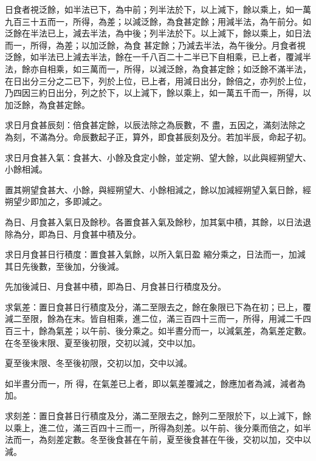 \begin{pinyinscope}
 日食者視泛餘，如半法已下，為中前；列半法於下，以上減下，餘以乘上，如一萬九百三十五而一，所得，為差；以減泛餘，為食甚定餘；用減半法，為午前分。如泛餘在半法已上，減去半法，為中後；列半法於下。以上減下，餘以乘上，如日法而一，所得，為差；以加泛餘，為食
 甚定餘；乃減去半法，為午後分。月食者視泛餘，如半法已上減去半法，餘在一千八百二十二半已下自相乘，已上者，覆減半法，餘亦自相乘，如三萬而一，所得，以減泛餘，為食甚定餘；如泛餘不滿半法，在日出分三分之二已下，列於上位，已上者，用減日出分，餘倍之，亦列於上位，乃四因三約日出分，列之於下，以上減下，餘以乘上，如一萬五千而一，所得，以加泛餘，為食甚定餘。



 求日月食甚辰刻：倍食甚定餘，以辰法除之為辰數，不
 盡，五因之，滿刻法除之為刻，不滿為分。命辰數起子正，算外，即食甚辰刻及分。若加半辰，命起子初。



 求日月食甚入氣：食甚大、小餘及食定小餘，並定朔、望大餘，以此與經朔望大、小餘相減。



 置其朔望食甚大、小餘，與經朔望大、小餘相減之，餘以加減經朔望入氣日餘，經朔望少即加之，多即減之。



 為日、月食甚入氣日及餘秒。各置食甚入氣及餘秒，加其氣中積，其餘，以日法退除為分，即為日、月食甚中積及分。



 求日月食甚日行積度：置食甚入氣餘，以所入氣日盈
 縮分乘之，日法而一，加減其日先後數，至後加，分後減。



 先加後減日、月食甚中積，即為日、月食甚日行積度及分。



 求氣差：置日食甚日行積度及分，滿二至限去之，餘在象限已下為在初；已上，覆減二至限，餘為在末。皆自相乘，進二位，滿三百四十三而一，所得，用減二千四百三十，餘為氣差；以午前、後分乘之。如半晝分而一，以減氣差，為氣差定數。在冬至後末限、夏至後初限，交初以減，交中以加。



 夏至後末限、冬至後初限，交初以加，交中以減。



 如半晝分而一，所
 得，在氣差已上者，即以氣差覆減之，餘應加者為減，減者為加。



 求刻差：置日食甚日行積度及分，滿二至限去之，餘列二至限於下，以上減下，餘以乘上，進二位，滿三百四十三而一，所得為刻差。以午前、後分乘而倍之，如半法而一，為刻差定數。冬至後食甚在午前，夏至後食甚在午後，交初以加，交中以減。




\end{pinyinscope}
